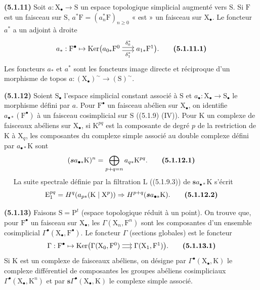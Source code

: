\documentclass[11pt,leqno]{article}
\newcommand{\Page}[1]{\ifvmode\noindent\else\unskip\ \fi{\footnotesize\textcolor{gray}{[p.\,#1]}}\ \ignorespaces}
\begin{document}
\textbf{(5.1.11)} Soit \(a:\mathrm{X}_{\bullet}\to\mathrm{S}\) un espace topologique simplicial augmenté vers \(\mathrm{S}\). Si \(\mathrm{F}\) est un faisceau sur \(\mathrm{S}\), \(a^*\mathrm{F}=(a_n^*\mathrm{F})_{n\geq0}\) « est » un faisceau sur \(\mathrm{X}_{\bullet}\). Le foncteur \(a^*\) a un adjoint à droite
\[
a_*:\mathrm{F}^{\bullet}\mapsto
\operatorname{Ker}\bigl(
\begin{tikzcd}[ampersand replacement=\&, cramped, column sep=1.7em, baseline=-0.5ex]
a_{0*}\mathrm{F}^0
  \arrow[r, shift left=0.5ex, "\delta_0^*"]
  \arrow[r, shift right=0.5ex, "\delta_1^*"']
\& a_{1*}\mathrm{F}^1
\end{tikzcd}
\bigr).
\tag*{\textbf{(5.1.11.1)}}
\]
Les foncteurs \(a_*\) et \(a^*\) sont les foncteurs image directe et réciproque d’un morphisme de topos \(a:(\mathrm{X}_{\bullet})^{\sim}\to(\mathrm{S})^{\sim}\).

\textbf{(5.1.12)} Soient \(\mathrm{S}_{\bullet}\) l’espace simplicial constant associé à \(\mathrm{S}\) et \(a_{\bullet}:\mathrm{X}_{\bullet}\to\mathrm{S}_{\bullet}\) le morphisme défini par \(a\). Pour \(\mathrm{F}^{\bullet}\) un faisceau abélien sur \(\mathrm{X}_{\bullet}\), on identifie \(a_{\bullet *}(\mathrm{F}^{\bullet})\) à un faisceau cosimplicial sur \(\mathrm{S}\) ((5.1.9) (IV)). Pour \(\mathrm{K}\) un complexe de faisceaux abéliens sur \(\mathrm{X}_{\bullet}\), si \(\mathrm{K}^{pq}\) est la composante de degré \(p\) de la restriction de \(\mathrm{K}\) à \(\mathrm{X}_q\), les composantes du complexe simple associé au double complexe défini par \(a_{\bullet *}\mathrm{K}\) sont
\[
(\boldsymbol{s}a_{\bullet *}\mathrm{K})^n
=\bigoplus_{p+q=n}a_{q*}\mathrm{K}^{pq}.
\tag*{\textbf{(5.1.12.1)}}
\]
\Page{12}
La suite spectrale définie par la filtration \(\mathrm{L}\) ((5.1.9.3)) de \(\boldsymbol{s}a_{\bullet *}\mathrm{K}\) s’écrit
\[
\mathrm{E}_1^{pq}
=H^q(a_{p*}(\mathrm{K}\mid\mathrm{X}^{p}))
\Rightarrow H^{p+q}(\boldsymbol{s}a_{\bullet *}\mathrm{K}).
\tag*{\textbf{(5.1.12.2)}}
\]

\textbf{(5.1.13)} Faisons \(\mathrm{S}=\mathrm{P}^{t}\) (espace topologique réduit à un point). On trouve que, pour \(\mathrm{F}^{\bullet}\) un faisceau sur \(\mathrm{X}_{\bullet}\), les \(\Gamma(\mathrm{X}_n,\mathrm{F}^n)\) sont les composantes d’un ensemble cosimplicial \(\Gamma^{\bullet}(\mathrm{X}_{\bullet},\mathrm{F}^{\bullet})\). Le foncteur \(\Gamma\) (sections globales) est le foncteur
\[
\Gamma:\mathrm{F}^{\bullet}\mapsto
\operatorname{Ker}\bigl(
\begin{tikzcd}[ampersand replacement=\&, cramped, column sep=1.4em, baseline=-0.5ex]
\Gamma(\mathrm{X}_0,\mathrm{F}^0)
  \arrow[r, shift left=0.5ex]
  \arrow[r, shift right=0.5ex]
\& \Gamma(\mathrm{X}_1,\mathrm{F}^1)
\end{tikzcd}
\bigr).
\tag*{\textbf{(5.1.13.1)}}
\]
Si \(\mathrm{K}\) est un complexe de faisceaux abéliens, on désigne par \(\Gamma^{\bullet}(\mathrm{X}_{\bullet},\mathrm{K})\) le complexe différentiel de composantes les groupes abéliens cosimpliciaux \(\Gamma^{\bullet}(\mathrm{X}_{\bullet},\mathrm{K}^n)\) et par \(\boldsymbol{s}\Gamma^{\bullet}(\mathrm{X}_{\bullet},\mathrm{K})\) le complexe simple associé.
\end{document}
